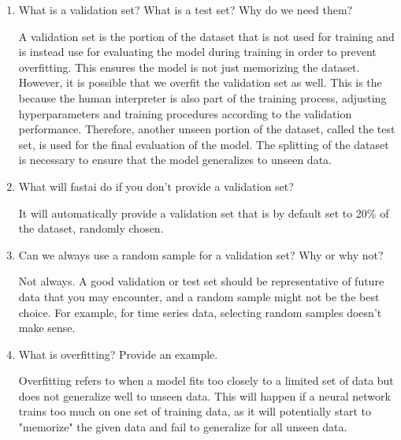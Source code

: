 \documentclass[12pt,a4paper]{article}
\begin{document}
\begin{enumerate}
\bigbreak

\item What is a validation set? What is a test set? Why do we need them? \\

\smallbreak

A validation set is the portion of the dataset that is not used for training and is instead use for evaluating the model during training in order to prevent overfitting. This ensures the model is not just memorizing the dataset. \\
\smallbreak
However, it is possible that we overfit the validation set as well. This is the because the human interpreter is also part of the training process, adjusting hyperparameters and training procedures according to the validation performance. Therefore, another unseen portion of the dataset, called the test set, is used for the final evaluation of the model. The splitting of the dataset is necessary to ensure that the model generalizes to unseen data.

\bigbreak

\item What will fastai do if you don't provide a validation set? \\

\smallbreak

It will automatically provide a validation set that is by default set to 20\% of the dataset, randomly chosen.

\bigbreak

\item Can we always use a random sample for a validation set? Why or why not? \\

\smallbreak

Not always. A good validation or test set should be representative of future data that you may encounter, and a random sample might not be the best choice. For example, for time series data, selecting random samples doesn't make sense.

\bigbreak

\item What is overfitting? Provide an example. \\

\smallbreak

Overfitting refers to when a model fits too closely to a limited set of data but does not generalize well to unseen data. This will happen if a neural network trains too much on one set of training data, as it will potentially start to "memorize" the given data and fail to generalize for all unseen data.


\end{enumerate}
\end{document}
